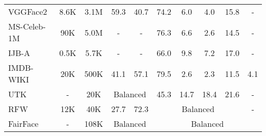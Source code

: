 \begin{table*}[htbp]
\begin{tabular}{lccccccccc}
VGGFace2~\cite{vggface2}              & 8.6K                      & 3.1M                    & 59.3             & 40.7          & 74.2                 & 6.0              & 4.0               & 15.8               & -                   \\
MS-Celeb-1M~\cite{MS_celeb_1m}           & 90K                       & 5.0M                    & -                & -             & 76.3                 & 6.6              & 2.6               & 14.5               & -                   \\ 
IJB-A~\cite{IJBC}                 & 0.5K                      & 5.7K                    & -                & -             & 66.0                 & 9.8              & 7.2               & 17.0               & -                   \\ 
IMDB-WIKI~\cite{IMDB_WIKI}             & 20K                          & 500K                    & 41.1                 & 57.1              & 79.5                 & 2.6              & 2.3               & 11.5               & 4.1                 \\ 
UTK~\cite{UTKFace}                   & -                          & 20K                     & \multicolumn{2}{c}{Balanced}               & 45.3                 & 14.7             & 18.4              & 21.6               & -                   \\ 
RFW~\cite{RFW_IMAN}                   & 12K                       & 40K                     & 27.7                & 72.3             & \multicolumn{4}{c}{Balanced}                & -                   \\ 
FairFace~\cite{Fairface}              & -                      & 108K                    & \multicolumn{2}{c}{Balanced}                       & \multicolumn{5}{c}{Balanced} \\ 
\bottomrule
\end{tabular}
\end{table*}



